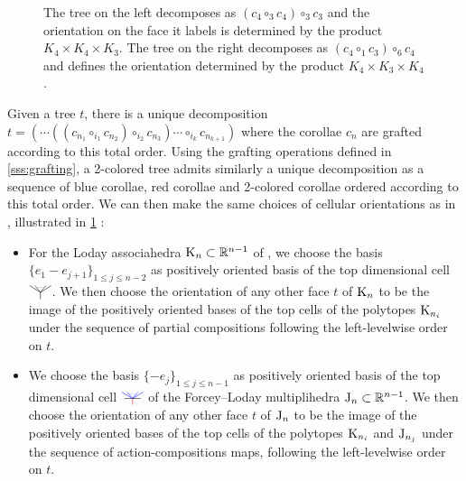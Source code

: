 \documentclass[twoside, 11pt]{amsart}
\theoremstyle{remark}
\begin{document}
\begin{figure}[h!]

\centering

\begin{subfigure}{0.4\textwidth}
\centering
\exampleleftlevelwiseone
\end{subfigure}
\begin{subfigure}{0.4\textwidth}
\centering
\exampleleftlevelwisetwo
\end{subfigure}

\caption{The tree on the left decomposes as $(c_4\circ_3 c_4)\circ_3 c_3$ and the orientation on the face it labels is determined by the product $K_4 \times K_4 \times K_3$. 
The tree on the right decomposes as $ (c_4\circ_1 c_3)\circ_6 c_4$ and defines the orientation determined by the product $K_4 \times K_3 \times K_4$.} 
\label{fig:left-levelwise-order}
\end{figure}

Given a tree $t$, there is a unique decomposition $t=(\cdots ((c_{n_1} \circ_{i_1} c_{n_2})\circ_{i_2}c_{n_3})\cdots \circ_{i_k} c_{n_{k+1}})$ where the corollae $c_n$ are grafted according to this total order. Using the grafting operations defined in \cref{sss:grafting}, a 2-colored tree admits similarly a unique decomposition as a sequence of blue corollae, red corollae and 2-colored corollae ordered according to this total order. 
We can then make the same choices of cellular orientations as in \cite[Section 1.4]{mazuir-I}, illustrated in \cref{fig:left-levelwise-order} :
\begin{itemize}
  \item For the Loday associahedra $\mathrm{K}_n \subset \mathbb{R}^{n-1}$ of \cite{MTTV19}, we choose the basis $\{e_1 - e_{j+1}\}_{1\leq j \leq n-2}$ as positively oriented basis of the top dimensional cell $\arbreop{0.15}$. We then choose the orientation of any other face $t$ of $\mathrm{K}_n$ to be the image of the positively oriented bases of the top cells of the polytopes $\mathrm{K}_{n_i}$ under the sequence of partial compositions following the left-levelwise order on $t$. 
  \item We choose the basis $\{- e_j\}_{1\leq j \leq n-1}$ as positively oriented basis of the top dimensional cell $\arbreopmorph{0.15}$ of the Forcey--Loday multiplihedra $\mathrm{J}_n \subset \mathbb{R}^{n-1}$. We then choose the orientation of any other face $t$ of $\mathrm{J}_n$ to be the image of the positively oriented bases of the top cells of the polytopes $\mathrm{K}_{n_i}$ and $\mathrm{J}_{n_j}$ under the sequence of action-compositions maps, following the left-levelwise order on $t$.
\end{itemize}
\end{document}
